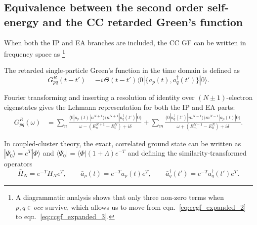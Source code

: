 \subsection{Equivalence between the second order self-energy and the CC retarded Green's function}
When both the IP and EA branches are included, the CC GF can be written in frequency space as
\footnote{A diagrammatic analysis shows that only three non-zero terms when $p, q \in o c c$ survive, which allows us to move from eqn.~\ref{eq:ccgf_expanded_2} to eqn.~\ref{eq:ccgf_expanded_3}.}
\begin{tcolorbox}
    The retarded single-particle Green's function in the time domain is defined as
\begin{equation}
    G_{pq}^R(t-t') = -i \, \Theta(t-t') 
    \langle 0 | \{ a_p(t), a_q^\dagger(t') \} |0\rangle .
\end{equation}

Fourier transforming and inserting a resolution of identity over $(N\!\pm\!1)$-electron eigenstates gives the Lehmann representation for both the IP and EA parts:
\begin{align}
    G_{pq}^R(\omega) 
    &= \sum_n \frac{ \langle 0 | a_p(t) | n^{N+1} \rangle \langle n^{N+1} | a_q^\dagger(t') |0\rangle }
      {\omega - (E_n^{N+1} - E_0^N) + i\delta} 
    + \sum_m \frac{ \langle 0 | a_q^\dagger(t') | m^{N-1} \rangle \langle m^{N-1} | a_p(t) |0\rangle }
      {\omega + (E_m^{N-1} - E_0^N) + i\delta}.
\label{spgf}
\end{align}

In coupled-cluster theory, the exact, correlated ground state can be written as $|\Psi_0\rangle = e^T |\Phi\rangle$ and $\langle \Psi_0| = \langle \Phi | (1+\Lambda) e^{-T}$ and defining the similarity-transformed operators
\begin{equation}
    \bar{H}_N = e^{-T} H_N e^{T}, \qquad
    \bar{a}_p(t) = e^{-T} a_p(t) e^{T}, \qquad
    \bar{a}_q^\dagger(t') = e^{-T} a_q^\dagger(t') e^{T}.
\end{equation}


\end{tcolorbox}
